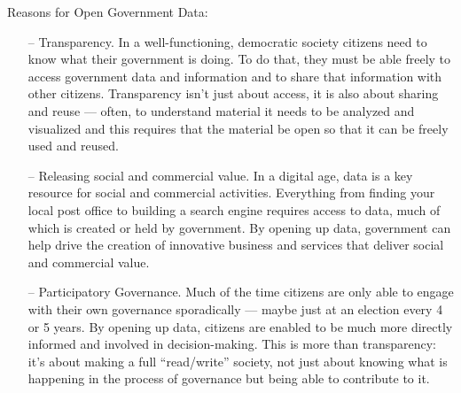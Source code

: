 \documentclass[12pt,a4paper,titlepage]{article}
\begin{document}
Reasons for Open Government Data:
\begin{itemize}
\item[--] Transparency. In a well-functioning, democratic society citizens need to know what their government is doing. To do that, they must be able freely to access government data and information and to share that information with other citizens. Transparency isn’t just about access, it is also about sharing and reuse — often, to understand material it needs to be analyzed and visualized and this requires that the material be open so that it can be freely used and reused.
\item[--] Releasing social and commercial value. In a digital age, data is a key resource for social and commercial activities. Everything from finding your local post office to building a search engine requires access to data, much of which is created or held by government. By opening up data, government can help drive the creation of innovative business and services that deliver social and commercial value.
\item[--] Participatory Governance. Much of the time citizens are only able to engage with their own governance sporadically — maybe just at an election every 4 or 5 years. By opening up data, citizens are enabled to be much more directly informed and involved in decision-making. This is more than transparency: it’s about making a full “read/write” society, not just about knowing what is happening in the process of governance but being able to contribute to it.\\
\end{itemize}
\end{document}
